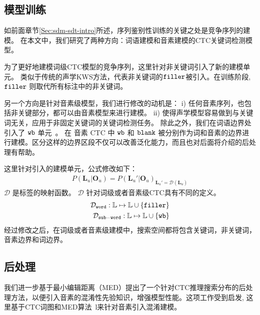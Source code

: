 \subsection{模型训练}
\label{Sec:modeltrain}

如前面章节\ref{Sec:sdm-sdt-intro}所述，序列鉴别性训练的关键之处是竞争序列的建模。
在本文中，我们研究了两种方向：词语建模和音素建模的CTC关键词检测模型。

为了更好地建模词级CTC模型的竞争序列，这里针对非关键词引入了新的建模单元。
类似于传统的声学KWS方法，代表非关键词的$\tt filler$被引入。在训练阶段, $\tt filler$ 则取代所有标注中的非关键词。

另一个方向是针对音素级模型，我们进行修改的动机是：
i) 任何音素序列，也包括非关键部分，都可以由音素模型来进行建模。
ii) 使得声学模型容易做到与关键词无关，应用于非固定关键词的关键词检测任务。
%
除此之外，我们在词语边界处引入了 $\tt wb$ 单元~\cite{zhuang-is2016}。 在 音素 CTC 中 $\tt wb$ 和 $\tt blank$ 被分别作为词和音素的边界进行建模。区分这样的边界区段不仅可以改善泛化能力，而且也对后面将介绍的后处理有帮助。

这里针对引入的建模单元，公式修改如下：
\begin{equation}
\label{equ:ctc-kw}
\begin{split}
P(\mathbf{L}_u|\mathbf{O}_u)=P(\mathbf{L}_u'|\mathbf{O}_u)_{\mathbf{L}_u' = \mathcal{D}(\mathbf{L}_u)}
\end{split}
\end{equation}
$\mathcal{D}$ 是标签的映射函数。 $\mathcal{D}$ 针对词级或者音素级CTC具有不同的定义。
\begin{equation}
\label{equ:ctc-d}
\begin{split}
\mathcal{D}_{\tt{word}}:\mathbb{L}  \mapsto \mathbb{L}  \cup \{{\tt filler}\}\\
\mathcal{D}_{\tt{sub-word}}:\mathbb{L}  \mapsto \mathbb{L}  \cup \{{\tt wb}\}
\end{split}
\end{equation}
经过修改之后，在词级或者音素级建模中，搜索空间都将包含关键词，非关键词，音素边界和词边界。

\subsection{后处理}
\label{Sec:post-process-ctc}

我们进一步基于最小编辑距离（MED）提出了一个针对CTC推理搜索分布的后处理方法，以便引入音素的混淆性先验知识，增强模型性能。这项工作受到\cite{chaudhari2007improvements}启发, 这里基于CTC词图和MED算法~\cite{7736093}l来针对音素引入混淆建模。 

